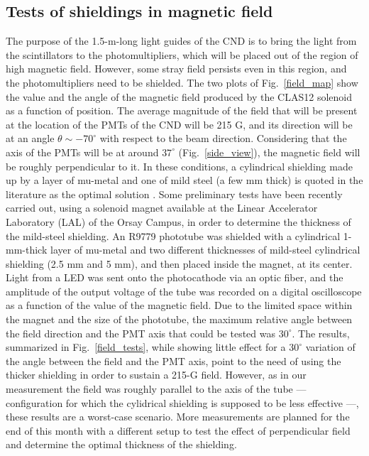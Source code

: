\documentclass[12pt,oneside]{article}
\begin{document}
{\subsection{Tests of shieldings in magnetic field}
The purpose of the 1.5-m-long light guides of the CND is to bring the light from the scintillators to the photomultipliers, which will be placed out of the region of high magnetic field. However, some stray field persists even in this region, and the photomultipliers need to be shielded. The two plots of Fig.~\ref{field_map} \cite{lionel} show the value and the angle of the magnetic field produced by the CLAS12 solenoid as a function of position. The average magnitude of the field that will be present at the location of the PMTs of the CND will be 215 G, and its direction will be at an angle $\theta\sim-70^{\circ}$ with respect to the beam direction. Considering that the axis of the PMTs will be at around $37^{\circ}$ (Fig.~\ref{side_view}), the magnetic field will be roughly perpendicular to it. In these conditions, a cylindrical shielding made up by a layer of mu-metal and one of mild steel (a few mm thick) is quoted in the literature as the optimal solution \cite{Hamamatsu}. 
Some preliminary tests have been recently carried out, using a solenoid magnet available at the Linear Accelerator Laboratory (LAL) of the Orsay Campus, in order to determine the thickness of the mild-steel shielding. An R9779 phototube was shielded with a cylindrical 1-mm-thick layer of mu-metal and two different thicknesses of mild-steel cylindrical shielding (2.5 mm and 5 mm), and then placed inside the magnet, at its center. Light from a LED was sent onto the photocathode via an optic fiber, and the amplitude of the output voltage of the tube was recorded on a digital oscilloscope as a function of the value of the magnetic field. Due to the limited space within the magnet and the size of the phototube, the maximum relative angle between the field direction and the PMT axis that could be tested was $30^{\circ}$. The results, summarized in Fig.~\ref{field_tests}, while showing little effect for a $30^{\circ}$ variation of the angle between the field and the PMT axis, point to the need of using the thicker shielding in order to sustain a 215-G field. However, as in our measurement the field was roughly parallel to the axis of the tube --- configuration for which the cylidrical shielding is supposed to be less effective \cite{Hamamatsu} ---, these results are a worst-case scenario. More measurements are planned for the end of this month with a different setup to test the effect of perpendicular field and determine the optimal thickness of the shielding. 

}
\end{document}
